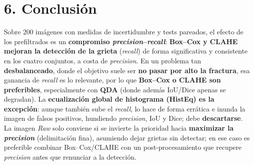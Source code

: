 \documentclass[11pt]{article}
\begin{document}
\section*{6. Conclusi\'on}
Sobre 200 im\'agenes con medidas de incertidumbre y tests pareados, el efecto de los
prefiltrados es un \textbf{compromiso \emph{precision}--\emph{recall}}: \textbf{Box--Cox
y CLAHE mejoran la detecci\'on de la grieta} (\emph{recall}) de forma significativa y
consistente en los cuatro conjuntos, a costa de \emph{precision}. En un problema tan
\textbf{desbalanceado}, donde el objetivo suele ser \textbf{no pasar por alto la
fractura}, esa ganancia de \emph{recall} es lo relevante, por lo que \textbf{Box--Cox o
CLAHE son preferibles}, especialmente con \textbf{QDA} (donde adem\'as IoU/Dice apenas
se degradan). La \textbf{ecualizaci\'on global de histograma (HistEq) es la excepci\'on}:
aunque tambi\'en sube el \emph{recall}, lo hace de forma err\'atica e inunda la imagen
de falsos positivos, hundiendo \emph{precision}, IoU y Dice; debe \textbf{descartarse}.
La imagen \emph{Raw} solo conviene si se invierte la prioridad hacia \textbf{maximizar
la \emph{precision}} (delimitaci\'on fina), asumiendo dejar grietas sin detectar; en ese
caso es preferible combinar Box--Cox/CLAHE con un post-procesamiento que recupere
\emph{precision} antes que renunciar a la detecci\'on.
\end{document}
